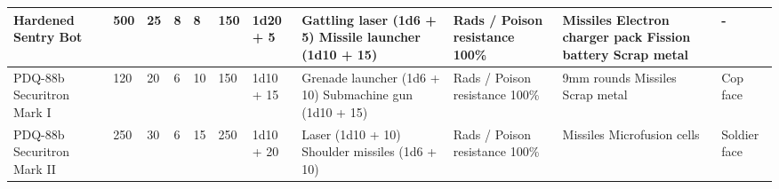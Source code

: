 \begin{longtable}{|p{2.5cm}|p{0.6cm}|p{0.6cm}|p{0.6cm}|p{0.6cm}|p{0.6cm}|p{1.5cm}|p{4cm}|p{4cm}|p{4cm}|p{2.3cm}|}
\hline
Hardened Sentry Bot & 500 & 25 & 8 & 8 & 150 & 1d20 + 5 & Gattling laser (1d6 + 5) \newline Missile launcher (1d10 + 15) & Rads / Poison resistance 100\% & Missiles \newline Electron charger pack \newline Fission battery \newline Scrap metal & - \\
\hline
PDQ-88b Securitron Mark I & 120 & 20 & 6 & 10 & 150 & 1d10 + 15 & Grenade launcher (1d6 + 10) \newline Submachine gun (1d10 + 15) & Rads / Poison resistance 100\% & 9mm rounds \newline Missiles \newline Scrap metal & Cop face \\
\hline
PDQ-88b Securitron Mark II & 250 & 30 & 6 & 15 & 250 & 1d10 + 20 & Laser (1d10 + 10) \newline Shoulder missiles (1d6 + 10) & Rads / Poison resistance 100\% & Missiles \newline Microfusion cells & Soldier face \\
\hline
\end{longtable}
